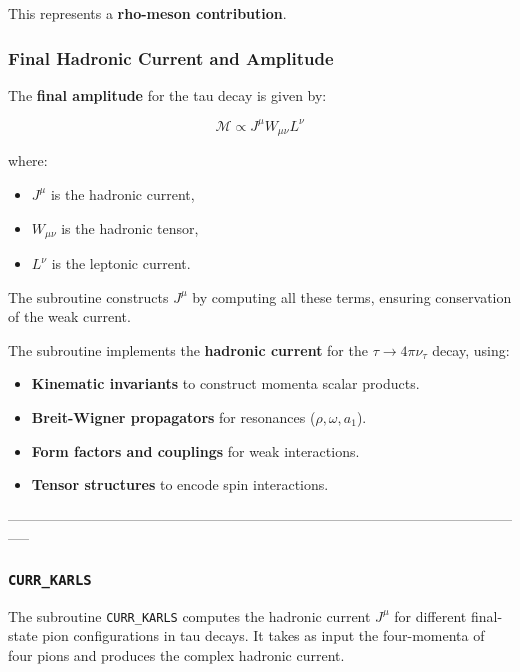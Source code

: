 \documentclass[12pt]{article}
\begin{document}
This represents a \textbf{rho-meson contribution}.

\subsubsection{Final Hadronic Current and Amplitude}

The \textbf{final amplitude} for the tau decay is given by:

\begin{equation}
\mathcal{M} \propto J^\mu W_{\mu\nu} L^\nu
\end{equation}

where:
\begin{itemize}
    \item \( J^\mu \) is the hadronic current,
    \item \( W_{\mu\nu} \) is the hadronic tensor,
    \item \( L^\nu \) is the leptonic current.
\end{itemize}

The subroutine constructs \( J^\mu \) by computing all these terms, ensuring conservation of the weak current.


The subroutine implements the \textbf{hadronic current} for the \(\tau \to 4\pi \nu_\tau\) decay, using:
\begin{itemize}
    \item \textbf{Kinematic invariants} to construct momenta scalar products.
    \item \textbf{Breit-Wigner propagators} for resonances (\( \rho, \omega, a_1 \)).
    \item \textbf{Form factors and couplings} for weak interactions.
    \item \textbf{Tensor structures} to encode spin interactions.
\end{itemize}


-----------------------------------------------------------------------------------------------------------------\\

\subsubsection{\texttt{CURR\_KARLS}}

The subroutine \texttt{CURR\_KARLS} computes the hadronic current \( J^\mu \) for different final-state pion configurations in tau decays. It takes as input the four-momenta of four pions and produces the complex hadronic current.
\end{document}
